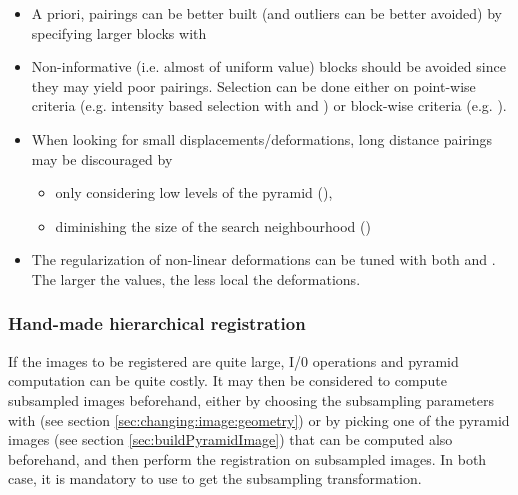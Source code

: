 \begin{itemize}

\item A priori, pairings can be better built (and outliers can be better avoided) by specifying larger blocks with  

\item Non-informative (i.e. almost of uniform value) blocks should be avoided since they may yield poor pairings. Selection can be done either on point-wise criteria (e.g. intensity based selection with  and ) or block-wise criteria (e.g. ).

\item When looking for small displacements/deformations, long distance pairings may be discouraged by
\begin{itemize}
\item only considering low levels of the pyramid (),
\item diminishing the size of the search neighbourhood ()
\end{itemize} 

\item The regularization of non-linear deformations can be tuned with both   and . The larger the values, the less local the deformations.

\end{itemize}


\subsubsection{Hand-made hierarchical registration}
\label{sec:hand:made:hierarchical:registration}


If the images to be registered are quite large, I/0 operations and pyramid computation can be quite costly. It may then be considered to compute subsampled images beforehand, either by choosing the subsampling parameters with \applyTrsf (see section \ref{sec:changing:image:geometry}) or by picking one of the pyramid images (see section \ref{sec:buildPyramidImage}) that can be computed also beforehand, and then perform the registration on subsampled images. 
In both case, it is mandatory to use  to get the subsampling transformation.

